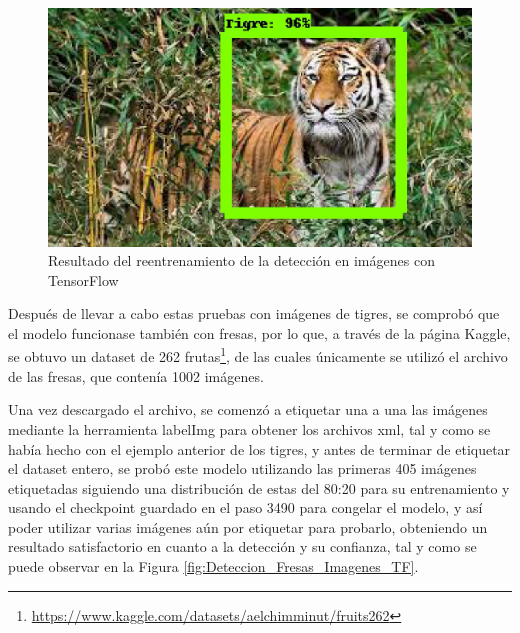 \begin{figure}[H]
\begin{minipage}{0.46\textwidth}
  \end{minipage}
  \hspace{2mm}
  \begin{minipage}{0.46\textwidth}
    \centering
    \includegraphics[width=\linewidth]{figs/tigre_5_v2.jpeg}
  \end{minipage}
  \caption{Resultado del reentrenamiento de la detección en imágenes con TensorFlow}
  \label{fig:deteccion_tensorflow_tigres_v2}
  \end{figure}

\pagebreak
Después de llevar a cabo estas pruebas con imágenes de tigres, se comprobó que el modelo funcionase también con fresas, por lo que, a través de la página Kaggle, se obtuvo un dataset de 262 frutas\footnote{\url{https://www.kaggle.com/datasets/aelchimminut/fruits262}}, de las cuales únicamente se utilizó el archivo de las fresas, que contenía 1002 imágenes.

Una vez descargado el archivo, se comenzó a etiquetar una a una las imágenes mediante la herramienta labelImg para obtener los archivos xml, tal y como se había hecho con el ejemplo anterior de los tigres, y antes de terminar de etiquetar el dataset entero, se probó este modelo utilizando las primeras 405 imágenes etiquetadas siguiendo una distribución de estas del 80:20 para su entrenamiento y usando el checkpoint guardado en el paso 3490 para congelar el modelo, y así poder utilizar varias imágenes aún por etiquetar para probarlo, obteniendo un resultado satisfactorio en cuanto a la detección y su confianza, tal y como se puede observar en la Figura \ref{fig:Deteccion_Fresas_Imagenes_TF}.

